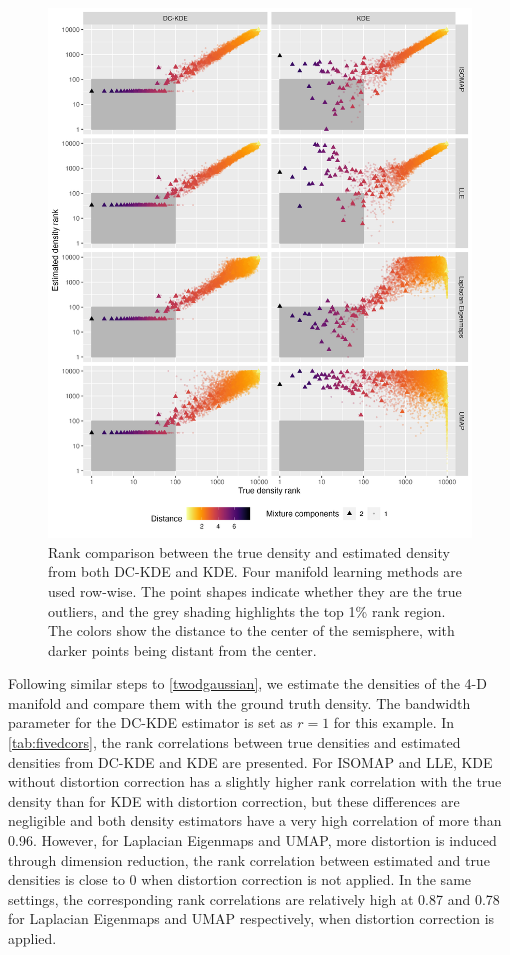 \documentclass[
]{article}
\begin{document}
\begin{figure}

{\centering \includegraphics[width=0.9\linewidth]{figures/sim4d10000_density_comparison_4ml_radius10_k200_rankdensity_circleoutlier_with1rec} 

}

\caption{Rank comparison between the true density and estimated density from both DC-KDE and KDE. Four manifold learning methods are used row-wise. The point shapes indicate whether they are the true outliers, and the grey shading highlights the top 1\% rank region. The colors show the distance to the center of the semisphere, with darker points being distant from the center.}\label{fig:fivedisomapden}
\end{figure}

Following similar steps to \autoref{twodgaussian}, we estimate the
densities of the 4-D manifold and compare them with the ground truth
density. The bandwidth parameter for the DC-KDE estimator is set as
\(r=1\) for this example. In \autoref{tab:fivedcors}, the rank
correlations between true densities and estimated densities from DC-KDE
and KDE are presented. For ISOMAP and LLE, KDE without distortion
correction has a slightly higher rank correlation with the true density
than for KDE with distortion correction, but these differences are
negligible and both density estimators have a very high correlation of
more than 0.96. However, for Laplacian Eigenmaps and UMAP, more
distortion is induced through dimension reduction, the rank correlation
between estimated and true densities is close to 0 when distortion
correction is not applied. In the same settings, the corresponding rank
correlations are relatively high at 0.87 and 0.78 for Laplacian
Eigenmaps and UMAP respectively, when distortion correction is applied.
\end{document}
